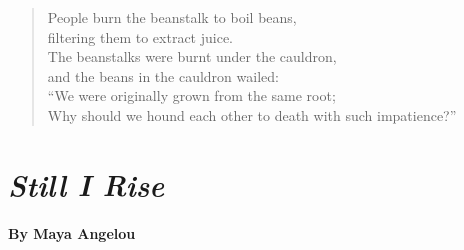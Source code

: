 \documentclass[12pt, openany, letterpaper]{memoir}
\begin{document}
\vspace{2em}
\begin{verse}
	People burn the beanstalk to boil beans,\\
	filtering them to extract juice.\\
	The beanstalks were burnt under the cauldron,\\
	and the beans in the cauldron wailed:\\
	“We were originally grown from the same root;\\
	Why should we hound each other to death with such impatience?”
\end{verse}

\newpage
\section*{\emph{Still I Rise}}
\paragraph{By Maya Angelou}~
\end{document}
